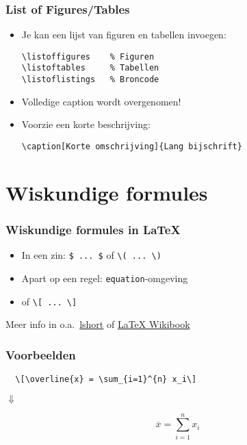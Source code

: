 \documentclass[aspectratio=169]{beamer}
\begin{document}
\begin{frame}[fragile]
  \frametitle{List of Figures/Tables}

  \begin{itemize}
    \item Je kan een lijst van figuren en tabellen invoegen:
\begin{verbatim}
\listoffigures    % Figuren
\listoftables     % Tabellen
\listoflistings   % Broncode
\end{verbatim}
    \item Volledige caption wordt overgenomen!
    \item Voorzie een korte beschrijving:
    
      \verb|\caption[Korte omschrijving]{Lang bijschrift}|
  \end{itemize}

\end{frame}

\section{Wiskundige formules}

\begin{frame}[fragile]
  \frametitle{Wiskundige formules in {\LaTeX}}

  \begin{itemize}
    \item In een zin: \verb+$ ... $+ of \verb+\( ... \)+
    \item Apart op een regel: \texttt{equation}-omgeving
    \item of \verb+\[ ... \]+
  \end{itemize}

  Meer info in o.a.~\href{https://tobi.oetiker.ch/lshort/lshort.pdf}{lshort} of \href{https://en.wikibooks.org/wiki/LaTeX/Mathematics}{LaTeX Wikibook}

\end{frame}

\begin{frame}[fragile]
  \frametitle{Voorbeelden}

\begin{verbatim}
  \[\overline{x} = \sum_{i=1}^{n} x_i\]
\end{verbatim}

  \bigskip

  \centering
  $\Downarrow$

  \bigskip

  \[\overline{x} = \sum_{i=1}^{n} x_i\]

\end{frame}
\end{document}
